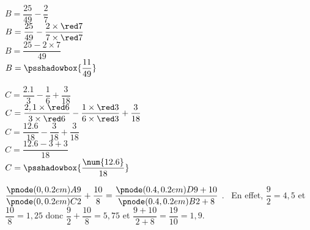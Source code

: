 \begin{methode*1}
    \smallskip
    \begin{spacing}{1.5}
        \begin{minipage}{0.48\linewidth}
            $B=\dfrac{25}{49}-\dfrac{2}{7}$\\
            $B=\dfrac{25}{49}-\dfrac{2\times {\red 7}}{7\times {\red 7}}$\\
            $B=\dfrac{25-2\times 7}{49}$\\
            $B=\psshadowbox{\dfrac{11}{49}}$
        \end{minipage}
        \begin{minipage}{0.48\linewidth}
            $C=\dfrac{\num{2.1}}{3}-\dfrac{1}{6}+\dfrac{3}{18}$\\
            $C=\dfrac{2,1\times {\red 6}}{3\times {\red 6}}-\dfrac{1\times {\red 3}}{6\times {\red 3}}+\dfrac{3}{18}$\\
            $C=\dfrac{\num{12.6}}{18}-\dfrac{3}{18}+\dfrac{3}{18}$\\
            $C=\dfrac{\num{12.6}-3+3}{18}$\\
            $C=\psshadowbox{\dfrac{\num{12.6}}{18}}$
        \end{minipage}        
    \end{spacing}
\end{methode*1}

\begin{remarque}

    $\dfrac{\pnode(0,0.2em){A}{9}}{\pnode(0,0.2em){C}{2}}+\dfrac{10}{8}=\dfrac{\pnode(0.4,0.2em){D}{9+10}}{\pnode(0.4,0.2em){B}{2+8}}$ .
    ~En effet, $\dfrac{9}{2}=4,5$ et $\dfrac{10}{8}=1,25$ donc $\dfrac{9}{2}+\dfrac{10}{8}=5,75$ et $\dfrac{9+10}{2+8}=\dfrac{19}{10}=1,9$.
\end{remarque}
